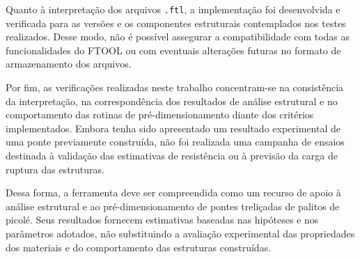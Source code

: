 Quanto à interpretação dos arquivos \texttt{.ftl}, a implementação foi desenvolvida e verificada para as versões e os componentes estruturais contemplados nos testes realizados. Desse modo, não é possível assegurar a compatibilidade com todas as funcionalidades do \acrshort{FTOOL} ou com eventuais alterações futuras no formato de armazenamento dos arquivos.

Por fim, as verificações realizadas neste trabalho concentram-se na consistência da interpretação, na correspondência dos resultados de análise estrutural e no comportamento das rotinas de pré-dimensionamento diante dos critérios implementados. Embora tenha sido apresentado um resultado experimental de uma ponte previamente construída, não foi realizada uma campanha de ensaios destinada à validação das estimativas de resistência ou à previsão da carga de ruptura das estruturas.

Dessa forma, a ferramenta deve ser compreendida como um recurso de apoio à análise estrutural e ao pré-dimensionamento de pontes treliçadas de palitos de picolé. Seus resultados fornecem estimativas baseadas nas hipóteses e nos parâmetros adotados, não substituindo a avaliação experimental das propriedades dos materiais e do comportamento das estruturas construídas.
